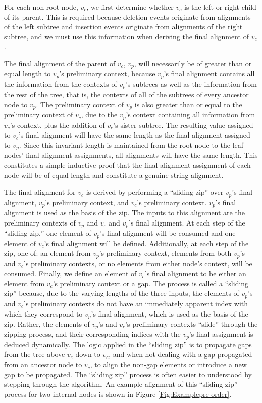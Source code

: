 \documentclass{bmcart}
\begin{document}
For each non-root node, $v_c$, we first determine whether $v_c$ is the left or right child of its parent.
This is required because deletion events originate from alignments of the left subtree and insertion events originate from alignments of the right subtree, and we must use this information when deriving the final alignment of $v_c$.

The final alignment of the parent of $v_c$, $v_p$, will necessarily be of greater than or equal length to $v_p$'s preliminary context, because $v_p$'s final alignment contains all the information from the contexts of $v_p$'s subtrees as well as the information from the rest of the tree, that is, the contexts of all of the subtrees of every ancestor node to $v_p$.
The preliminary context of $v_p$ is also greater than or equal to the preliminary context of $v_c$, due to the $v_p$'s context containing all information from $v_c$'s context, plus the addition of $v_c$'s sister subtree.
The resulting value assigned to $v_c$'s final alignment will have the same length as the final alignment assigned to $v_p$.
Since this invariant length is maintained from the root node to the leaf nodes' final alignment assignments, all alignments will have the same length.
This constitutes a simple inductive proof that the final alignment assignment of each node will be of equal length and constitute a genuine string alignment.

The final alignment for $v_c$ is derived by performing a ``sliding zip'' over $v_p$'s final alignment, $v_p$'s preliminary context, and $v_c$'s preliminary context.
$v_p$'s final alignment is used as the basis of the zip.
The inputs to this alignment are the preliminary contexts of $v_p$ and $v_c$ and $v_p$'s final alignment.
At each step of the ``sliding zip,'' one element of $v_p$'s final alignment will be consumed and one element of $v_c$'s final alignment will be defined.
Additionally, at each step of the zip, one of: an element from $v_p$'s preliminary context, elements from both $v_p$'s and $v_c$'s preliminary contexts, or no elements from either node's context, will be consumed.
Finally, we define an element of $v_c$'s final alignment to be either an element from $v_c$'s preliminary context or a gap.
The process is called a ``sliding zip'' because, due to the varying lengths of the three inputs, the elements of $v_p$'s and $v_c$'s preliminary contexts do not have an immediately apparent index with which they correspond to $v_p$'s final alignment, which is used as the basis of the zip.
Rather, the elements of $v_p$'s and $v_c$'s preliminary contexts ``slide'' through the zipping process, and their corresponding indices with the $v_p$'s final assignment is deduced dynamically.
The logic applied in the ``sliding zip'' is to propagate gaps from the tree above $v_c$ down to $v_c$, and when not dealing with a gap propagated from an ancestor node to $v_c$, to align the non-gap elements or introduce a new gap to be propagated.
The ``sliding zip'' process is often easier to  understood by stepping through the algorithm.
An example alignment of this ``sliding zip'' process for two internal nodes is shown in Figure \ref{Fig:Examplepre-order}.
\end{document}
